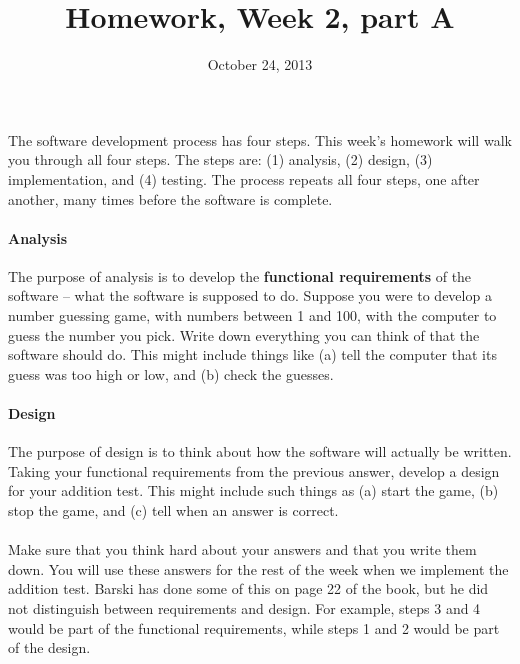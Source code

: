 \documentclass{article}
\title{Homework, Week 2, part A}
\date{October 24, 2013}
\begin{document}
\maketitle{}

\paragraph{}The software development process has four steps. This week's homework will walk you through all four steps. The steps are: (1) analysis, (2) design, (3) implementation, and (4) testing. The process repeats all four steps, one after another, many times before the software is complete.

\paragraph{Analysis}The purpose of analysis is to develop the \textbf{functional requirements} of the software -- what the software is supposed to do. Suppose you were to develop a number guessing game, with numbers between 1 and 100, with the computer to guess the number you pick. Write down everything you can think of that the software should do. This might include things like (a) tell the computer that its guess was too high or low, and (b) check the guesses.

\paragraph{Design}The purpose of design is to think about how the software will actually be written. Taking your functional requirements from the previous answer, develop a design for your addition test. This might include such things as (a) start the game, (b) stop the game, and (c) tell when an answer is correct.

\paragraph{}Make sure that you think hard about your answers and that you write them down. You will use these answers for the rest of the week when we implement the addition test. Barski has done some of this on page 22 of the book, but he did not distinguish between requirements and design. For example, steps 3 and 4 would be part of the functional requirements, while steps 1 and 2 would be part of the design.

%
%
%
%
%
\end{document}
